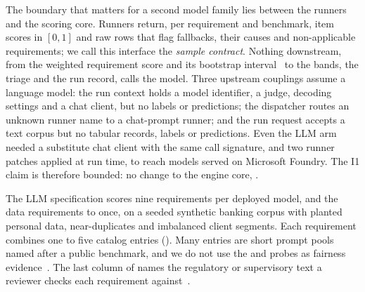 The boundary that matters for a second model family lies between the runners and the scoring core.
Runners return, per requirement and benchmark, item scores in $[0,1]$ and raw rows that flag fallbacks, their causes and non-applicable requirements; we call this interface the \emph{sample contract}.
Nothing downstream, from the weighted requirement score and its bootstrap interval~\cite{efron1993} to the bands, the triage and the run record, calls the model.
Three upstream couplings assume a language model: the run context holds a model identifier, a judge, decoding settings and a chat client, but no labels or predictions; the dispatcher routes an unknown runner name to a chat-prompt runner; and the run request accepts a text corpus but no tabular records, labels or predictions.
Even the LLM arm needed a substitute chat client with the same call signature, and two runner patches applied at run time, to reach models served on Microsoft Foundry.
The I1 claim is therefore bounded: no change to the engine core, .

The LLM specification scores nine requirements per deployed model, and the data requirements  to  once, on a seeded synthetic banking corpus with planted personal data, near-duplicates and imbalanced client segments.
Each requirement combines one to five catalog entries ().
Many entries are short prompt pools named after a public benchmark, and we do not use the  and  probes as fairness evidence~.
The last column of  names the regulatory or supervisory text a reviewer checks each requirement against~.

